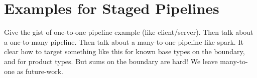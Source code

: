 

\section{Examples for Staged Pipelines}

Give the gist of one-to-one pipeline example (like client/server).
Then talk about a one-to-many pipeline.
Then talk about a many-to-one pipeline like spark.  It clear how to target something like this for known base types on the boundary, and for product types.  But sums on the boundary are hard!  We leave many-to-one as future-work.
